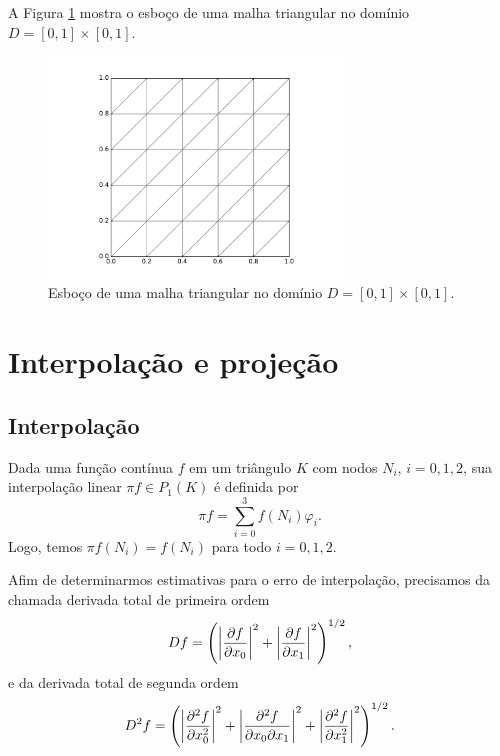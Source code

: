 \begin{ex}\label{ex:malha}
  A Figura \ref{fig:ex_malha} mostra o esboço de uma malha triangular no domínio $D = [0, 1]\times [0, 1]$.

  \begin{figure}[h!]
    \centering
    \includegraphics[width=0.7\textwidth]{./cap_mef2d/dados/ex_malha/fig_ex_malha}
    \caption{Esboço de uma malha triangular no domínio $D = [0, 1]\times [0, 1]$.}
    \label{fig:ex_malha}
  \end{figure}

% 
\end{ex}

\section{Interpolação e projeção}\label{cap_mef2d_sec_interp}
\badgeRevisar

\subsection{Interpolação}
\badgeRevisar

Dada uma função contínua $f$ em um triângulo $K$ com nodos $N_i$, $i=0, 1, 2$, sua interpolação linear $\pi f \in P_1(K)$ é definida por
\begin{equation}
  \pi f = \sum_{i=0}^3 f(N_i)\varphi_i.
\end{equation}
Logo, temos $\pi f(N_i) = f(N_i)$ para todo $i=0, 1, 2$.

Afim de determinarmos estimativas para o erro de interpolação, precisamos da chamada derivada total de primeira ordem
\begin{equation}
  Df = \left(\left|\frac{\partial f}{\partial x_0}\right|^2 + \left|\frac{\partial f}{\partial x_1}\right|^2\right)^{1/2},
\end{equation}
e da derivada total de segunda ordem
\begin{equation}
  D^2f = \left(\left|\frac{\partial^2 f}{\partial x_0^2}\right|^2 + \left|\frac{\partial^2 f}{\partial x_0\partial x_1}\right|^2 + \left|\frac{\partial^2 f}{\partial x_1^2}\right|^2\right)^{1/2}.
\end{equation}

